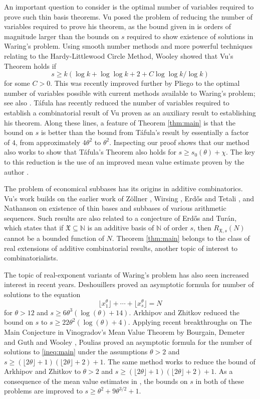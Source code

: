 \documentclass[11pt,reqno]{amsart}
\numberwithin{equation}{section}
\begin{document}
An important question to consider is the optimal number of variables required to prove such thin basis theorems. Vu \cite{VuRef} posed the problem of reducing the number of variables required to prove his theorem, as the bound given in \cite{VuRef} is orders of magnitude larger than the bounds on $s$ required to show existence of solutions in Waring's problem. Using smooth number methods and more powerful techniques relating to the Hardy-Littlewood Circle Method, Wooley \cite{WoolThin} showed that Vu's Theorem holds if 
\[ s \geq k(\log k+\log \log k+2+C\log\log k/\log k) \] 
for some $C > 0$. This was recently improved further by Pliego \cite{pliegoVu} to the optimal number of variables possible with current methods available to Waring's problem; see also \cite{BW}. T\'{a}fula \cite{tafbox} has recently reduced the number of variables required to establish a combinatorial result of Vu \cite{VuRef} proven as an auxiliary result to establishing his theorem. Along these lines, a feature of Theorem \ref{thm:main} is that the bound on $s$ is  better than the bound from T\'{a}fula's result by essentially a factor of $4$, from approximately $4\theta^2$ to $\theta^2$. Inspecting our proof shows that our method also works to show that T\'{a}fula's Theorem also holds for $s \geq s_0(\theta)+\chi$. The key to this reduction is the use of an improved mean value estimate proven by the author \cite{BharMVE}. 

The problem of economical subbases has its origins in additive combinatorics. Vu's work builds on the earlier work of Z\"{o}llner \cite{Zollthesis, Zollpaper}, Wirsing \cite{Wirsing}, Erd\H{o}s and Tetali \cite{ErdTet}, and Nathanson \cite{Nat} on existence of thin bases and subbases of various arithmetic sequences. Such results are also related to a conjecture of Erd\H{o}s and Tur\'{a}n, which states that if $\mathfrak{X} \subseteq \mathbb{N}$ is an additive basis of $\mathbb{N}$ of order $s$, then $R_{\mathfrak{X},s}(N)$ cannot be a bounded function of $N$. Theorem \ref{thm:main} belongs to the class of real extensions of additive combinatorial results, another topic of interest to combinatorialists. 

The topic of real-exponent variants of Waring's problem has also seen increased interest in recent years. 
Deshouillers \cite{Des} proved an asymptotic formula for number of solutions to the equation 
\[ \lfloor x_1^{\theta} \rfloor+\cdots+\lfloor x_s^{\theta} \rfloor = N \]
for $\theta >12$ and $s \geq 6\theta^3(\log(\theta)+14)$. Arkhipov and Zhitkov \cite{ArkhZhit} reduced the bound on $s$ to $s \geq 22 \theta^2(\log(\theta)+4)$. Applying recent breakthroughs on The Main Conjecture in Vinogradov's Mean Value Theorem by Bourgain, Demeter and Guth \cite{BDG} and Wooley \cite{WooleyCube, WooNEC}, Poulias \cite{Poulias1} proved an asymptotic formula for the number of solutions to \eqref{ineq:main} under the assumptions $\theta > 2$ and $s \geq (\lfloor 2\theta\rfloor+1)(\lfloor 2\theta \rfloor+2)+1$. The same method works to reduce the bound of Arkhipov and Zhitkov to $\theta > 2$ and $s \geq (\lfloor 2\theta\rfloor+1)(\lfloor 2\theta \rfloor+2)+1$. As a consequence of the mean value estimates in \cite{BharMVE}, the bounds on $s$ in both of these problems are improved to $s \geq \theta^2+9\theta^{3/2}+1$. 
\end{document}
